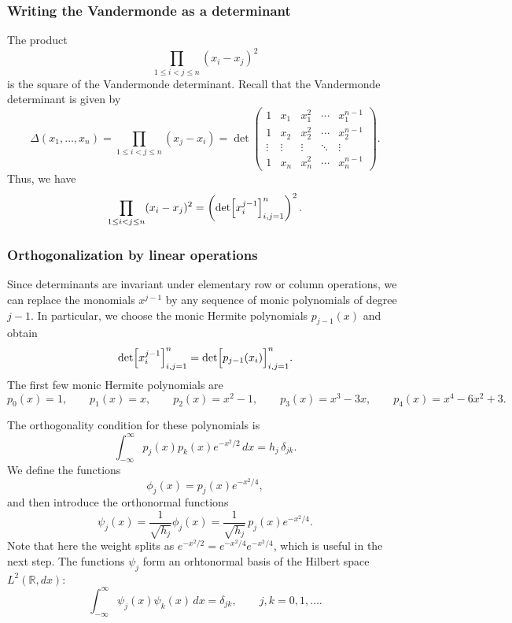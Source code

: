 \documentclass[letterpaper,11pt,oneside,reqno]{book}
\numberwithin{equation}{chapter}  %
\theoremstyle{definition}
\begin{document}
\subsubsection{Writing the Vandermonde as a determinant}
The product
\[
\prod_{1\le i<j\le n} (x_i-x_j)^2
\]
is the square of the Vandermonde determinant. Recall that the Vandermonde determinant is given by
\[
\Delta(x_1,\dots,x_n) = \prod_{1\le i<j\le n} (x_j-x_i) = \det\begin{pmatrix}
1 & x_1 & x_1^2 & \cdots & x_1^{n-1}\\[1mm]
1 & x_2 & x_2^2 & \cdots & x_2^{n-1}\\[1mm]
\vdots & \vdots & \vdots & \ddots & \vdots\\[1mm]
1 & x_n & x_n^2 & \cdots & x_n^{n-1}
\end{pmatrix}.
\]
Thus, we have
\[
\prod_{1\le i<j\le n} (x_i-x_j)^2 = \left(\det\Bigl[x_i^{j-1}\Bigr]_{i,j=1}^n\right)^2.
\]

\subsubsection{Orthogonalization by linear operations}

Since determinants are invariant under elementary row or column
operations, we can replace the monomials $x^{j-1}$ by
any sequence of monic polynomials of degree $j-1$. In
particular, we choose the monic Hermite polynomials
$p_{j-1}(x)$ and obtain
\[
\det\Bigl[x_i^{j-1}\Bigr]_{i,j=1}^n = \det\Bigl[p_{j-1}(x_i)\Bigr]_{i,j=1}^n.
\]
The first few monic Hermite polynomials are
\begin{equation*}
	p_0(x)=1,\qquad
	p_1(x)=x,\qquad
	p_2(x)=x^2-1,\qquad
	p_3(x)=x^3-3x,\qquad
	p_4(x)=x^4-6x^2+3.
\end{equation*}


The orthogonality condition for these polynomials is
\[
\int_{-\infty}^\infty p_j(x)p_k(x)e^{-x^2/2}\,dx = h_j\,\delta_{jk}.
\]
We define the functions
\begin{equation}
\label{lecture5:eq:phi_j}
\phi_j(x)=p_j(x)e^{-x^2/4},
\end{equation}
and then introduce the orthonormal functions
\begin{equation}
\label{lecture5:eq:psi_j}
\psi_j(x)=\frac{1}{\sqrt{h_j}}\phi_j(x)=\frac{1}{\sqrt{h_j}}\,p_j(x)e^{-x^2/4}.
\end{equation}
Note that here the weight splits as $e^{-x^2/2}=e^{-x^2/4}e^{-x^2/4}$, which is useful in the next step.
The functions $\psi_j$ form an orhtonormal basis of the Hilbert space $L^2(\mathbb{R},dx)$:
\begin{equation*}
	\int_{-\infty}^\infty \psi_j(x)\psi_k(x)\,dx = \delta_{jk},\qquad j,k=0,1,\dots.
\end{equation*}
\end{document}
